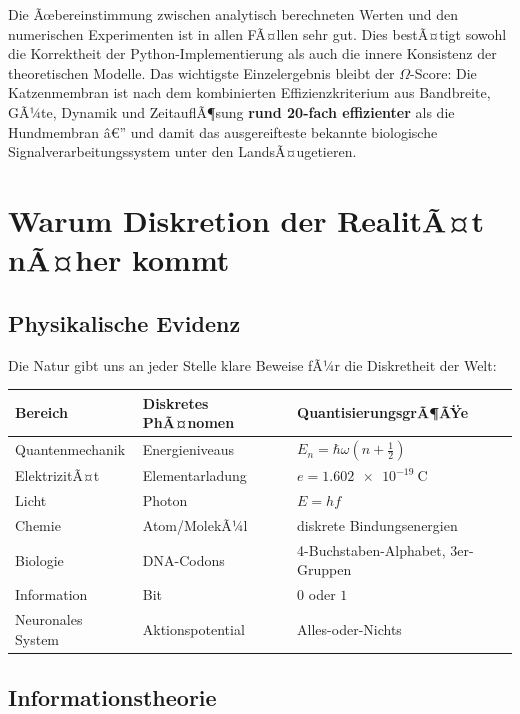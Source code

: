 ﻿\documentclass[12pt,a4paper,titlepage]{report}
\begin{document}
Die Ãœbereinstimmung zwischen analytisch berechneten Werten und
den numerischen Experimenten ist in allen FÃ¤llen sehr gut.
Dies bestÃ¤tigt sowohl die Korrektheit der Python-Implementierung
als auch die innere Konsistenz der theoretischen Modelle.
Das wichtigste Einzelergebnis bleibt der $\Omega$-Score:
Die Katzenmembran ist nach dem kombinierten Effizienzkriterium
aus Bandbreite, GÃ¼te, Dynamik und ZeitauflÃ¶sung
\textbf{rund 20-fach effizienter} als die Hundmembran â€”
und damit das ausgereifteste bekannte biologische
Signalverarbeitungssystem unter den LandsÃ¤ugetieren.

\chapter{Warum Diskretion der RealitÃ¤t nÃ¤her kommt}

\section{Physikalische Evidenz}

Die Natur gibt uns an jeder Stelle klare Beweise fÃ¼r die Diskretheit der Welt:

\begin{center}
\begin{tabular}{lll}
\toprule
\textbf{Bereich} & \textbf{Diskretes PhÃ¤nomen} & \textbf{QuantisierungsgrÃ¶ÃŸe} \\
\midrule
Quantenmechanik & Energieniveaus & $E_n = \hbar\omega(n + \tfrac{1}{2})$ \\
ElektrizitÃ¤t & Elementarladung & $e = \SI{1.602e-19}{\coulomb}$ \\
Licht & Photon & $E = hf$ \\
Chemie & Atom/MolekÃ¼l & diskrete Bindungsenergien \\
Biologie & DNA-Codons & 4-Buchstaben-Alphabet, 3er-Gruppen \\
Information & Bit & $0$ oder $1$ \\
Neuronales System & Aktionspotential & Alles-oder-Nichts \\
\bottomrule
\end{tabular}
\end{center}

\section{Informationstheorie}
\end{document}
